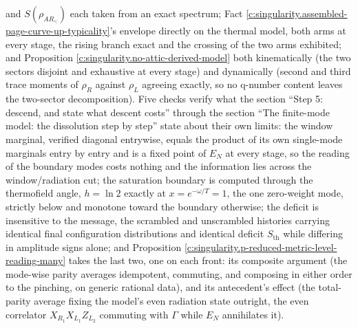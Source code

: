 \documentclass[11pt]{article}
\theoremstyle{definition}
\theoremstyle{plain}
\providecommand{\EN}{}\renewcommand{\EN}{E_{N}}
\providecommand{\Sth}{}\renewcommand{\Sth}{S_{\mathrm{th}}}
\begin{document}
and $S(\rho_{AR_<})$ each taken from an exact spectrum; Fact \ref{c:singularity.assembled-page-curve-up-typicality}'s envelope directly on the thermal model, both arms at every stage, the rising branch exact and the crossing of the two arms exhibited; and Proposition \ref{c:singularity.no-attic-derived-model} both kinematically (the two sectors disjoint and exhaustive at every stage) and dynamically (second and third trace moments of $\rho_R$ against $\rho_L$ agreeing exactly, so no q-number content leaves the two-sector decomposition). Five checks verify what the section ``Step 5: descend, and state what descent costs'' through the section ``The finite-mode model: the dissolution step by step'' state about their own limits: the window marginal, verified diagonal entrywise, equals the product of its own single-mode marginals entry by entry and is a fixed point of $\EN$ at every stage, so the reading of the boundary modes costs nothing and the information lies across the window/radiation cut; the saturation boundary is computed through the thermofield angle, $h = \ln 2$ exactly at $x = e^{-\omega/T} = 1$, the one zero-weight mode, strictly below and monotone toward the boundary otherwise; the deficit is insensitive to the message, the scrambled and unscrambled histories carrying identical final configuration distributions and identical deficit $\Sth$ while differing in amplitude signs alone; and Proposition \ref{c:singularity.p-reduced-metric-level-reading-many} takes the last two, one on each front: its composite argument (the mode-wise parity averages idempotent, commuting, and composing in either order to the pinching, on generic rational data), and its antecedent's effect (the total-parity average fixing the model's even radiation state outright, the even correlator $X_{R_1}X_{L_1}Z_{L_2}$ commuting with $\Gamma$ while $\EN$ annihilates it).
\end{document}
